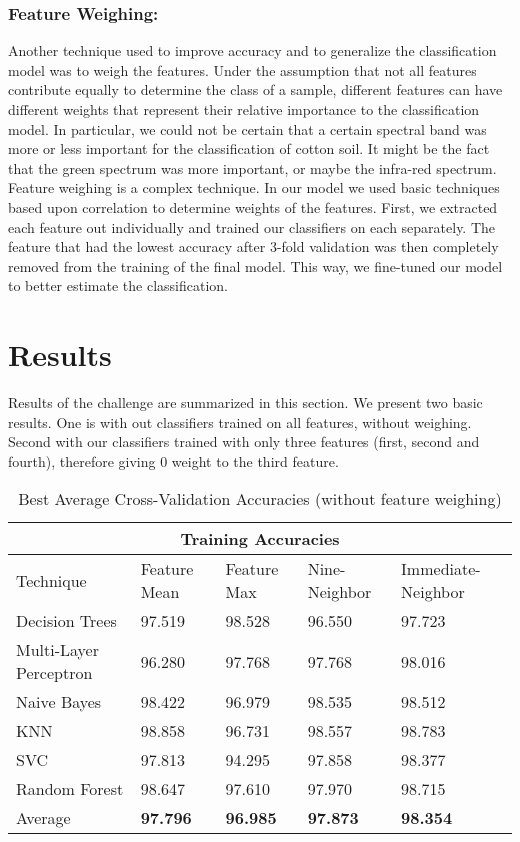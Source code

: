 \documentclass{llncs}
\begin{document}
\subsubsection{Feature Weighing:} Another technique used to improve accuracy and to generalize the classification model was to weigh the features. Under the assumption that not all features contribute equally to determine the class of a sample, different features can have different weights that represent their relative importance to the classification model. In particular, we could not be certain that a certain spectral band was more or less important for the classification of cotton soil. It might be the fact that the green spectrum was more important, or maybe the infra-red spectrum. 
\newline
Feature weighing is a complex technique. In our model we used basic techniques based upon correlation to determine weights of the features. 
First, we extracted each feature out individually and trained our classifiers on each separately. The feature that had the lowest accuracy after 3-fold validation was then completely removed from the training of the final model. This way, we fine-tuned our model to better estimate the classification.

\section{Results}
Results of the challenge are summarized in this section. We present two basic results. One is with out classifiers trained on all features, without weighing. Second with our classifiers trained with only three features (first, second and fourth), therefore giving 0 weight to the third feature.  

\begin{table}
\centering
  \caption{Best Average Cross-Validation Accuracies (without feature weighing) }
\begin{tabular}{ |p{3cm}||p{2cm}|p{2cm}|p{2cm}| p{2cm}| }
 \hline
 \multicolumn{5}{|c|}{Training Accuracies} \\
 \hline
 Technique                  &Feature Mean    &Feature Max    &Nine-Neighbor  &Immediate-Neighbor\\
 \hline
  Decision Trees            &97.519    &98.528         &96.550         &97.723\\
  Multi-Layer Perceptron    &96.280    &97.768      &97.768     &98.016\\
 Naive Bayes                &98.422    &96.979      &98.535     &98.512\\
 KNN                        &98.858    &96.731      &98.557     &98.783\\
 SVC                        &97.813    &94.295      &97.858     &98.377\\
 Random Forest              &98.647    &97.610      &97.970     &98.715\\
 \hline
 Average     &\textbf{97.796}     &\textbf{96.985}       &\textbf{97.873}     &\textbf{98.354}\\
  \hline
\end{tabular}
\label{table}
\end{table}
\end{document}
